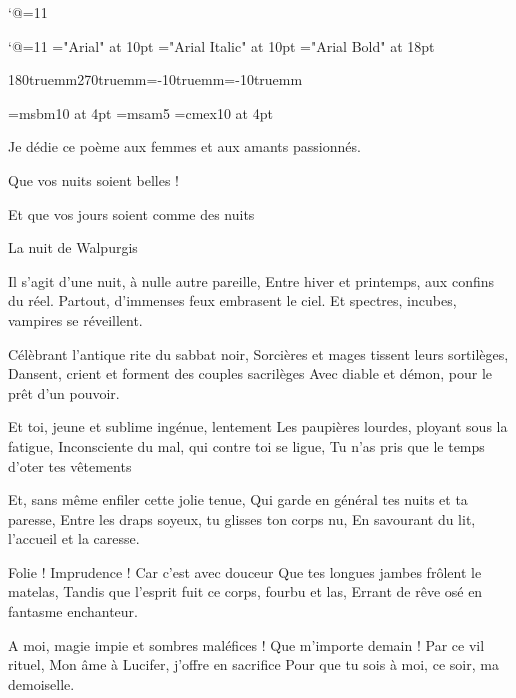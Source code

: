
%
%
%
%
%
%

\catcode`@=11\relax




\catcode`@=11\relax
\font\LD@Font@Arial="Arial" at 10pt
\font\LD@Font@Arial@Italic="Arial Italic" at 10pt
\font\LD@Font@Big@Arial="Arial Bold" at 18pt

\hsize180truemm\vsize 270truemm\hoffset=-10truemm\voffset=-10truemm
\parindent3mm
\overfullrule=0pt

\font\fourbb=msbm10 at 4pt
\font\fivemsa=msam5
\font\fourex=cmex10 at 4pt

\noindent\LD@Font@Arial@Italic
\centerline{Je dédie ce poème aux femmes et aux amants passionnés. }
\centerline{Que vos nuits soient belles !}
\centerline{Et que vos jours soient comme des nuits }
\bigskip
\bigskip
\centerline{\LD@Font@Big@Arial La nuit de Walpurgis}
\bigskip
\bigskip
\twocolumns
\noindent\LD@Font@Arial
Il s'agit d'une nuit, à nulle autre pareille,\pn
Entre hiver et printemps, aux confins du réel.\pn
Partout, d'immenses feux embrasent le ciel.\pn
Et spectres, incubes, vampires se réveillent.

\bigskip
\noindent
Célèbrant l'antique rite du sabbat noir,\pn
Sorcières et mages tissent leurs sortilèges,\pn
Dansent, crient et forment des couples sacrilèges\pn
Avec diable et démon, pour le prêt d'un pouvoir.

\bigskip
\noindent
Et toi, jeune et sublime ingénue, lentement\pn 
Les paupières lourdes, ployant sous la fatigue,\pn
Inconsciente du mal, qui contre toi se ligue,\pn
Tu n'as pris que le temps d'oter tes vêtements

\bigskip
\noindent
Et, sans même enfiler cette jolie tenue,\pn
Qui garde en général tes nuits et ta paresse,\pn
Entre les draps soyeux, tu glisses ton corps nu, \pn
En savourant du lit, l'accueil et la caresse.

\bigskip
\noindent
Folie ! Imprudence ! Car c'est avec douceur\pn
Que tes longues jambes frôlent le matelas,\pn
Tandis que l'esprit fuit ce corps, fourbu et las,\pn
Errant de rêve osé en fantasme enchanteur.

\bigskip
\noindent
A moi, magie impie et sombres maléfices !\pn
Que m'importe demain ! Par ce vil rituel,\pn
Mon âme à Lucifer, j'offre en sacrifice\pn
Pour que tu sois à moi, ce soir, ma demoiselle.

